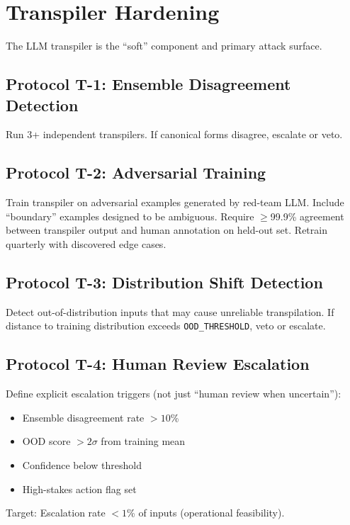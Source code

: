 \documentclass[11pt,letterpaper]{article}
\theoremstyle{definition}
\theoremstyle{remark}
\begin{document}
\section{Transpiler Hardening}

The LLM transpiler is the ``soft'' component and primary attack surface.

\subsection{Protocol T-1: Ensemble Disagreement Detection}

Run 3+ independent transpilers. If canonical forms disagree, escalate or veto.

\subsection{Protocol T-2: Adversarial Training}

Train transpiler on adversarial examples generated by red-team LLM. Include ``boundary'' examples designed to be ambiguous. Require $\geq$99.9\% agreement between transpiler output and human annotation on held-out set. Retrain quarterly with discovered edge cases.

\subsection{Protocol T-3: Distribution Shift Detection}

Detect out-of-distribution inputs that may cause unreliable transpilation. If distance to training distribution exceeds \texttt{OOD\_THRESHOLD}, veto or escalate.

\subsection{Protocol T-4: Human Review Escalation}

Define explicit escalation triggers (not just ``human review when uncertain''):
\begin{itemize}
\item Ensemble disagreement rate $> 10$\%
\item OOD score $> 2\sigma$ from training mean
\item Confidence below threshold
\item High-stakes action flag set
\end{itemize}
Target: Escalation rate $< 1$\% of inputs (operational feasibility).
\end{document}
